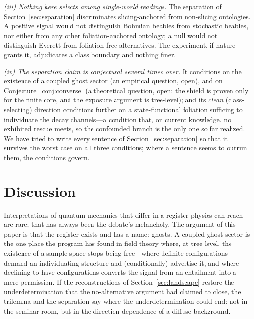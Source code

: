 \documentclass[11pt]{article}
\theoremstyle{remark}
\begin{document}
\emph{(iii) Nothing here selects among single-world readings.} The
separation of Section~\ref{sec:separation} discriminates
slicing-anchored from non-slicing ontologies. A positive signal would
not distinguish Bohmian beables from stochastic beables, nor either
from any other foliation-anchored ontology; a null would not
distinguish Everett from foliation-free alternatives. The experiment,
if nature grants it, adjudicates a class boundary and nothing finer.

\emph{(iv) The separation claim is conjectural several times over.} It
conditions on the existence of a coupled ghost sector (an empirical
question, open), and on Conjecture~\ref{conj:converse} (a theoretical
question, open: the shield is proven only for the finite core, and
the exposure argument is tree-level); and its \emph{clean} (class-%
selecting) direction conditions further on a state-functional foliation
sufficing to individuate the decay channels---a condition that, on
current knowledge, no exhibited rescue meets, so the confounded branch
is the only one so far realized. We have tried to write every
sentence of Section~\ref{sec:separation} so that it survives the
worst case on all three conditions; where a sentence seems to outrun
them, the conditions govern.

\section{Discussion}
\label{sec:discussion}

Interpretations of quantum mechanics that differ in a register
physics can reach are rare; that has always been the debate's
melancholy. The argument of this paper is that the register exists
and has a name: ghosts. A coupled ghost sector is the one place the program has found in
field theory where, at tree level, the existence of a sample space
stops being free---where definite configurations demand an
individuating structure and (conditionally) advertise it, and where
declining to have configurations converts the signal from an entailment
into a mere permission. If the reconstructions of
Section~\ref{sec:landscape} restore the underdetermination that the
no-alternative argument had claimed to close, the trilemma and the
separation say where the underdetermination could end: not in the
seminar room, but in the direction-dependence of a diffuse
background.
\end{document}
